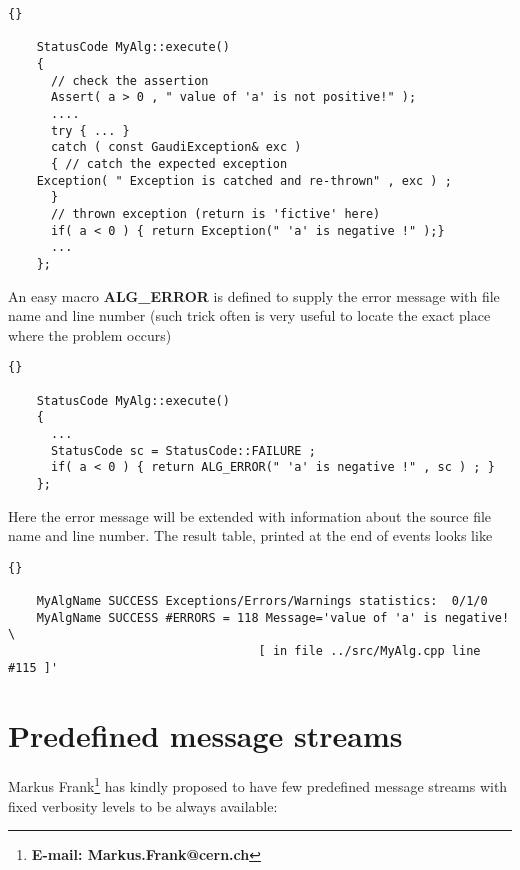 \documentclass{lhcbnote}
\newcommand{\bftt}         {\ttfamily\bfseries}
\begin{document}
\begin{scriptsize}
 \begin{lstlisting}{}

    StatusCode MyAlg::execute()
    {
      // check the assertion
      Assert( a > 0 , " value of 'a' is not positive!" );
      ....
      try { ... }
      catch ( const GaudiException& exc )
      { // catch the expected exception
	Exception( " Exception is catched and re-thrown" , exc ) ;
      }
      // thrown exception (return is 'fictive' here)
      if( a < 0 ) { return Exception(" 'a' is negative !" );}
      ...
    };

 \end{lstlisting}
\end{scriptsize}

An easy macro {\bftt{ALG\_ERROR}} is defined
to supply the error message with file name and line number
(such trick often is very useful to locate the exact place where
the problem occurs)

\begin{scriptsize}
 \begin{lstlisting}{}

    StatusCode MyAlg::execute()
    {
      ...
      StatusCode sc = StatusCode::FAILURE ;
      if( a < 0 ) { return ALG_ERROR(" 'a' is negative !" , sc ) ; }
    };

 \end{lstlisting}
\end{scriptsize}

 Here the error message will be extended with information
about the source file name and line number.
The result table, printed at the end of events looks like

\begin{scriptsize}
  \begin{lstlisting}{}

    MyAlgName SUCCESS Exceptions/Errors/Warnings statistics:  0/1/0
    MyAlgName SUCCESS #ERRORS = 118 Message='value of 'a' is negative! \
                                   [ in file ../src/MyAlg.cpp line #115 ]'
  \end{lstlisting}
\end{scriptsize}


\section{Predefined message streams}
Markus Frank\footnote{\bftt{E-mail: Markus.Frank@cern.ch}} has kindly proposed to have few predefined message
streams with fixed verbosity levels to be always available:
\end{document}
